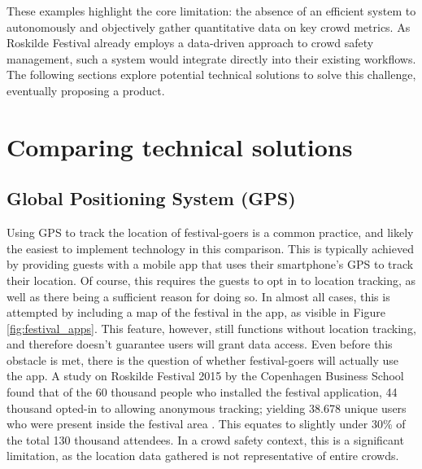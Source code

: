 These examples highlight the core limitation: the absence of an efficient system to autonomously and objectively gather quantitative data on key crowd metrics. As Roskilde Festival already employs a data-driven approach to crowd safety management, such a system would integrate directly into their existing workflows. The following sections explore potential technical solutions to solve this challenge, eventually proposing a product.

\section{Comparing technical solutions}

\subsection{Global Positioning System (GPS)}
\label{sec:gps}

Using GPS to track the location of festival-goers is a common practice, and likely the easiest to implement technology in this comparison. This is typically achieved by providing guests with a mobile app that uses their smartphone's GPS to track their location. Of course, this requires the guests to opt in to location tracking, as well as there being a sufficient reason for doing so. In almost all cases, this is attempted by including a map of the festival in the app, as visible in Figure \ref{fig:festival_apps}. This feature, however, still functions without location tracking, and therefore doesn't guarantee users will grant data access. Even before this obstacle is met, there is the question of whether festival-goers will actually use the app. A study on Roskilde Festival 2015 by the Copenhagen Business School  found that of the 60 thousand people who installed the festival application, 44 thousand opted-in to allowing anonymous tracking; yielding 38.678 unique users who were present inside the festival area \cite{rf_app}. This equates to slightly under 30\% of the total 130 thousand attendees. In a crowd safety context, this is a significant limitation, as the location data gathered is not representative of entire crowds.

